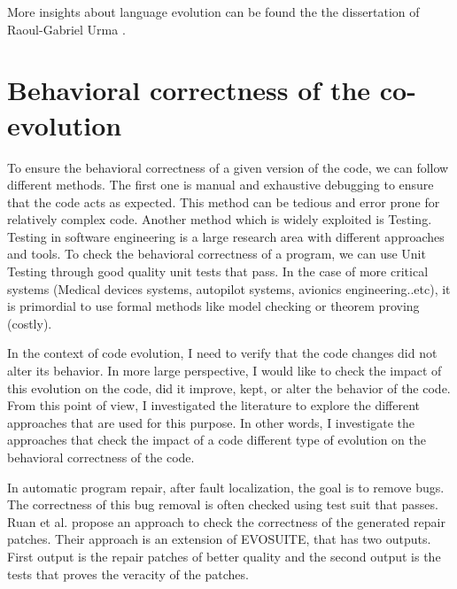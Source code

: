More insights about language evolution can be found the the dissertation of Raoul-Gabriel Urma \cite{urma2017programming}. 
	
 \section{Behavioral correctness of the co-evolution}
 \label{behavioralcorrectness}
 
 
 
 
 
 

 To ensure the behavioral correctness of a given version of the code, we can follow different methods. The first one is manual and exhaustive debugging to ensure that the code acts as expected. This method can be tedious and error prone for relatively complex code. Another method which is widely exploited is Testing. Testing in software engineering is a large research area with different approaches and tools. To check the behavioral correctness of a program, we can use Unit Testing through good quality unit tests that pass. In the case of more critical systems (Medical devices systems, autopilot systems, avionics engineering..etc), it is primordial to use formal methods like model checking or theorem proving \cite{ZHANG201312} (costly).
 
 In the context of code evolution, I need to verify that the code changes did not alter its behavior. 
 In more large perspective, I would like to check the impact of this evolution on the code, did it improve, kept, or alter the behavior of the code. From this point of view, I investigated the literature to explore the different approaches that are used for this purpose. In other words, I investigate the approaches  that check the impact of a code different type of evolution on the behavioral correctness of the code.
 
In automatic program repair, after fault localization, the goal is to remove bugs. The correctness of this bug removal is often checked using test suit that passes.
Ruan et al. \cite{10638555} propose an approach to check the correctness of the generated repair patches. Their approach is an extension of EVOSUITE, that has two outputs. First output is the repair patches of better quality and the second output is  the tests that proves the veracity of the patches.

